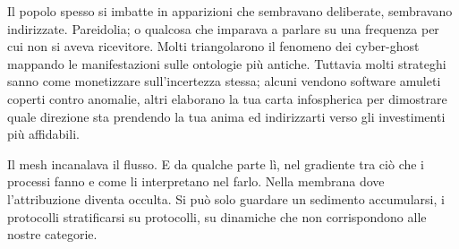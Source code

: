 Il popolo spesso si imbatte in apparizioni che sembravano deliberate, sembravano indirizzate. Pareidolia; o qualcosa che imparava a parlare su una frequenza per cui non si aveva ricevitore. Molti triangolarono il fenomeno dei cyber-ghost mappando le manifestazioni sulle ontologie più antiche. Tuttavia molti strateghi sanno come monetizzare sull'incertezza stessa; alcuni vendono software amuleti coperti contro anomalie, altri elaborano la tua carta infospherica per dimostrare quale direzione sta prendendo la tua anima ed indirizzarti verso gli investimenti più affidabili.

Il mesh incanalava il flusso. E da qualche parte lì, nel gradiente tra ciò che i processi fanno e come li interpretano nel farlo. Nella membrana dove l'attribuzione diventa occulta. Si può solo guardare un sedimento accumularsi, i protocolli stratificarsi su protocolli, su dinamiche che non corrispondono alle nostre categorie.
